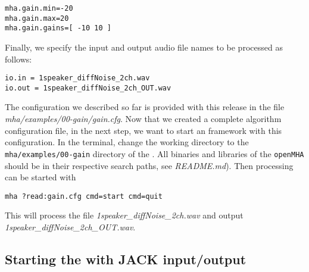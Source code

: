 \begin{verbatim}
mha.gain.min=-20
mha.gain.max=20
mha.gain.gains=[ -10 10 ]
\end{verbatim}

%
Finally, we specify the input and output audio file names to be processed as 
follows:
\begin{verbatim}
io.in = 1speaker_diffNoise_2ch.wav
io.out = 1speaker_diffNoise_2ch_OUT.wav
\end{verbatim}
The configuration we described so far is provided with this release 
in the file \emph{mha/examples/00-gain/gain.cfg}.
Now that we created a complete \mha{} algorithm configuration file,
in the next step, we want to start an \mha{} framework with this configuration.
%
In the terminal, change the working directory to the
\verb!mha/examples/00-gain!
directory of the \mha{}.
All binaries and libraries of the \verb!openMHA! should be in their respective
search paths, see \emph{README.md}).
Then \mha{} processing can be started with
\begin{verbatim}
mha ?read:gain.cfg cmd=start cmd=quit
\end{verbatim}
%
This will process the file \emph{1speaker\_diffNoise\_2ch.wav} and output 
\emph{1speaker\_diffNoise\_2ch\_OUT.wav}.


\subsection{Starting the \mhad{} with JACK input/output}%
\label{sec:example_jack}%
%
%
%

